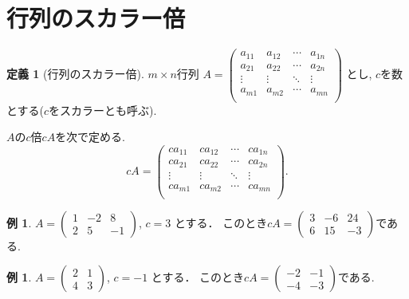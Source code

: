 \documentclass[dvipdfmx,a4paper,11pt]{article}
\theoremstyle{definition}
\newtheorem{dfn}[thm]{定義}
\newtheorem{exa}[thm]{例}
\begin{document}
 \section{行列のスカラー倍}
 
  \begin{tcolorbox}[
    colback = white,
    colframe = green!35!black,
    fonttitle = \bfseries,
    breakable = true]
    \begin{dfn}[行列のスカラー倍]
    \text{}
    
 $m \times n$行列
 $
A=\begin{pmatrix}
a_{11}& a_{12} & \cdots &a_{1n} \\
a_{21}& a_{22} & \cdots &a_{2n} \\
\vdots& \vdots	&	\ddots   &	\vdots \\
a_{m1}& a_{m2} & \cdots &a_{mn} \\
\end{pmatrix}$
とし, $c$を数とする($c$をスカラーとも呼ぶ).

$A$の$c$倍$cA$を次で定める.
$$
cA=
\begin{pmatrix}
ca_{11}&c a_{12} & \cdots &ca_{1n} \\
ca_{21}& ca_{22} & \cdots &ca_{2n} \\
\vdots& \vdots	&	\ddots   &	\vdots \\
ca_{m1}& ca_{m2} & \cdots &ca_{mn} \\
\end{pmatrix}.
$$
  \end{dfn}
 \end{tcolorbox}

\begin{exa}
 $A = 
 \begin{pmatrix}
 1 &-2&8 \\
 2&5&-1
 \end{pmatrix}
 $,
 $
 c =3
 $
 とする．
 このとき$
 cA =
 \begin{pmatrix}
 3 &-6&24 \\
 6&15&-3
 \end{pmatrix}
 $である.
 \end{exa}
 \begin{exa}
 $A = 
 \begin{pmatrix}
 2&1 \\
 4&3
 \end{pmatrix}
 $, 
 $
 c =-1
 $
 とする．
 このとき$
 cA =
 \begin{pmatrix}
 -2 &-1 \\
-4&-3
 \end{pmatrix}
 $である.
 \end{exa}
 
\end{document}
